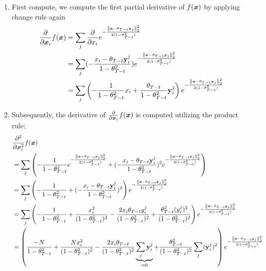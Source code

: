 \begin{enumerate}
    \item First compute, we compute the first partial derivative of $f(\boldsymbol{x})$ by applying change rule again
    \begin{align}
        \frac{\partial}{\partial \boldsymbol{x}_i} f(\boldsymbol{x}) &= \sum_j \frac{\partial}{\partial x_i} e^{-\frac{{\left\lVert\boldsymbol{x} - \theta_{T - t}\mathbf{y}_j\right\rVert}_{2}^2}{2 ( 1 - \theta_{T-t}^2)}}\nonumber\\
        &=\sum_j  (-\frac{x_i - \theta_{T - t}\mathbf{y}_i^j}{1 - \theta_{T-t}^2}) e^{-\frac{{\left\lVert\boldsymbol{x} - \theta_{T - t}\mathbf{y}_j\right\rVert}_{2}^2}{2 ( 1 - \theta_{T-t}^2)}}\nonumber\\
        &=\sum_j \left(-\frac{1}{1 - \theta_{T-t}^2}  x_i   + \frac{\theta_{T - t}}{1 - \theta_{T-t}^2}\mathbf{y}_i^j \right) e^{-\frac{{\left\lVert\boldsymbol{x} - \theta_{T - t}\mathbf{y}_j\right\rVert}_{2}^2}{2 ( 1 - \theta_{T-t}^2)}}
    \end{align}
    \item Subsequently, the derivative of $ \frac{\partial}{\partial \boldsymbol{x}_i} f(\boldsymbol{x})$ is computed utilizing the product rule:
    \begin{align}
        &\frac{\partial^2}{\partial \vect{x}^2_i} f(\vect{x})\\ &=  \sum_j  \left(-\frac{1}{1 - \theta_{T-t}^2} e^{-\frac{\norm{\vect{x} - \theta_{T - t}\mathbf{y}_j}{2}^2}{2 ( 1 - \theta_{T-t}^2)}}  + (-\frac{x_i - \theta_{T - t}\mathbf{y}_i ^j}{1 - \theta_{T-t}^2})^2 e^{-\frac{\norm{\vect{x} - \theta_{T - t}\mathbf{y}_j}{2}^2}{2 ( 1 - \theta_{T-t}^2)}}\right) \nonumber\\
        &=  \sum_j  \left(-\frac{1}{1 - \theta_{T-t}^2}  + (-\frac{x_i - \theta_{T - t}\mathbf{y}_i^j}{1 - \theta_{T-t}^2})^2 \right) e^{-\frac{\norm{\vect{x} - \theta_{T - t}\mathbf{y}_j}{2}^2}{2 ( 1 - \theta_{T-t}^2)}} \nonumber\\
        &=  \sum_j  \left(-\frac{1}{1 - \theta_{T-t}^2}  +
        \frac{x_i^2}{(1 - \theta_{T-t}^2)^2}
        -\frac{2 x_i \theta_{T - t} y_i^j}{(1 - \theta_{T-t}^2)^2} +
        \frac{\theta_{T - t}^2 (y_i^j)^2}{(1 - \theta_{T-t}^2)^2} \right) e^{-\frac{\norm{\vect{x} - \theta_{T - t}\mathbf{y}_j}{2}^2}{2 ( 1 - \theta_{T-t}^2)}} \nonumber\\
        &=    \left(\frac{-N}{1 - \theta_{T-t}^2}  +
        \frac{N x_i^2}{(1 - \theta_{T-t}^2)^2}
        - \frac{2x_i \theta_{T - t}}{(1 - \theta_{T-t}^2)^2} \underbrace{\sum_j \mathbf{y}_i^j}_{= 0}+
        \frac{\theta_{T - t}^2}{(1 - \theta_{T-t}^2)^2} \sum_j(\mathbf{y}_i^j)^2 \right) e^{-\frac{\norm{\vect{x} - \theta_{T - t}\mathbf{y}_j}{2}^2}{2 ( 1 - \theta_{T-t}^2)}} \nonumber\\

\end{align}
\end{enumerate}
